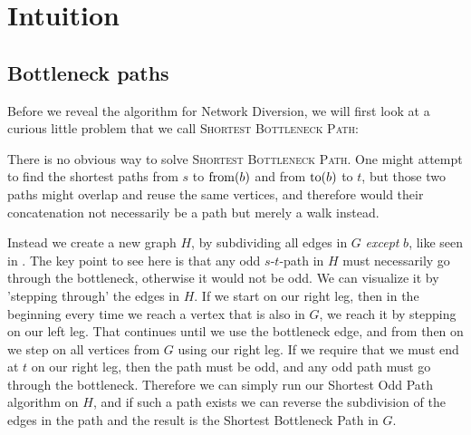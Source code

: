 \section{Intuition}
\subsection{Bottleneck paths}
\label{section:subdividing-bottlenecks}
Before we reveal the algorithm for Network Diversion, we will first look at a curious little problem that we call \textsc{Shortest Bottleneck Path}:

\noindent{}

There is no obvious way to solve \textsc{Shortest Bottleneck Path}. One might attempt to find the shortest paths from $s$ to $\operatorname{from}(b)$ and from $\operatorname{to}(b)$ to $t$, but those two paths might overlap and reuse the same vertices, and therefore would their concatenation not necessarily be a path but merely a walk instead.

Instead we create a new graph $H$, by subdividing all edges in $G$ \emph{except} $b$, like seen in . The key point to see here is that any odd $s$-$t$-path in $H$ must necessarily go through the bottleneck, otherwise it would not be odd. We can visualize it by 'stepping through' the edges in $H$. If we start on our right leg, then in the beginning every time we reach a vertex that is also in $G$, we reach it by stepping on our left leg. That continues until we use the bottleneck edge, and from then on we step on all vertices from $G$ using our right leg. If we require that we must end at $t$ on our right leg, then the path must be odd, and any odd path must go through the bottleneck. Therefore we can simply run our Shortest Odd Path algorithm on $H$, and if such a path exists we can reverse the subdivision of the edges in the path and the result is the Shortest Bottleneck Path in $G$.

